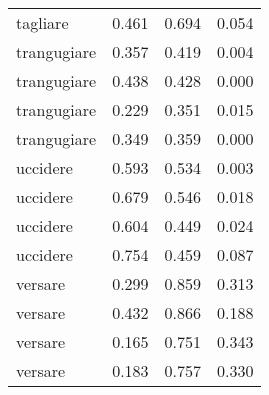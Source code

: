 \begin{longtable}{l|rrr}
tagliare       & 0.461  & 0.694     & 0.054         \\
trangugiare    & 0.357  & 0.419     & 0.004         \\
trangugiare    & 0.438  & 0.428     & 0.000             \\
trangugiare    & 0.229  & 0.351     & 0.015         \\
trangugiare    & 0.349  & 0.359     & 0.000             \\
uccidere       & 0.593  & 0.534     & 0.003         \\
uccidere       & 0.679  & 0.546     & 0.018         \\
uccidere       & 0.604  & 0.449     & 0.024         \\
uccidere       & 0.754  & 0.459     & 0.087         \\
versare        & 0.299  & 0.859     & 0.313         \\
versare        & 0.432  & 0.866     & 0.188         \\
versare        & 0.165  & 0.751     & 0.343         \\
versare        & 0.183  & 0.757     & 0.330        
\end{longtable}